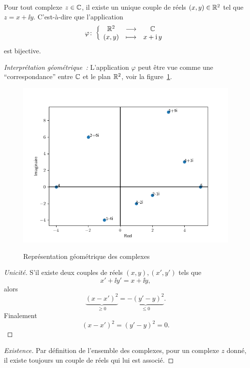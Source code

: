 %
\begin{prop}
  Pour tout complexe \(z \in \mathbb{C}\), il existe un unique couple de réels \((x,y) \in \mathbb{R}^2\) tel que \(z=x+\ii y\). C'est-à-dire que l'application
  \begin{equation}
    \varphi\colon \left\{\begin{array}{ccc} \mathbb{R}^2 & \longrightarrow &\mathbb{C}\\ (x,y) & \longmapsto & x+\operatorname{i} y \end{array} \right.
  \end{equation}
  est bijective.
\end{prop}
\emph{Interprétation géométrique~:} L'application $\varphi$ peut être vue comme une ``correspondance'' entre $\mathbb{C}$ et le plan $\mathbb{R}^2$, voir la figure~\ref{fig:complexe}.
\begin{figure}
    \centering
    \includegraphics[scale=0.4]{./Complexes.png}
    \label{fig:complexe}
    \caption{Représentation géométrique des complexes}
\end{figure}
\begin{proof}[Unicité]
  S'il existe deux couples de réels \((x,y),(x',y')\) tels que
  \begin{equation}
    x'+\ii y'=x +\ii y,
  \end{equation}
  alors
  \begin{equation}
    \underbrace{(x-x')^2}_{\geqslant 0}=\underbrace{-(y'-y)^2}_{\leqslant 0}.
  \end{equation}
  Finalement
  \begin{equation}
    (x-x')^2=(y'-y)^2=0.
  \end{equation}
\end{proof}
\begin{proof}[Existence]
  Par définition de l'ensemble des complexes, pour un complexe \(z\) donné, il existe toujours un couple de réels qui lui est associé.
\end{proof}
